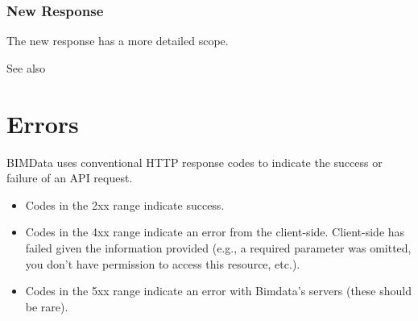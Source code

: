 \documentclass[a4paper,12pt,english]{sphinxmanual}
\begin{document}
\subsubsection{New Response}
\label{\detokenize{guide/authentication_migration:new-response}}
The new response has a more detailed scope.

%
\begin{sphinxVerbatim}[commandchars=\\\{\}]
     
     
     
     
\end{sphinxVerbatim}




See also {\hyperref[\detokenize{guide/authentication_bimdata_connect::doc}]{}}



\ignorespaces 

\section{Errors}
\label{\detokenize{guide/errors:errors}}\label{\detokenize{guide/errors:index-0}}\label{\detokenize{guide/errors::doc}}
BIMData uses conventional HTTP response codes to indicate the success or failure of an API request.
\begin{itemize}
\item {} 
Codes in the 2xx range indicate success.

\item {} 
Codes in the 4xx range indicate an error from the client-side. Client-side has failed given the information provided (e.g., a required parameter was omitted, you don’t have permission to access this resource, etc.).

\item {} 
Codes in the 5xx range indicate an error with Bimdata’s servers (these should be rare).

\end{itemize}
\end{document}
